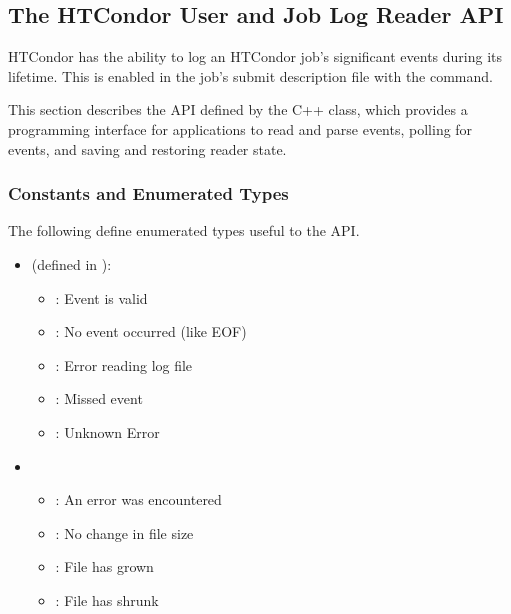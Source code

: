 \subsection{\label{sec:job-log-reader}The HTCondor User and Job Log Reader API}

HTCondor has the ability to log an HTCondor job's significant events during 
its lifetime.
This is enabled in the job's submit description file with the
 command.

This section describes the API defined by the C++  class,
which provides a programming interface for applications
to read and parse events,
polling for events, and saving and restoring reader state.

\subsubsection{Constants and Enumerated Types}

The following define enumerated types useful to the API.

\begin{itemize}
\item {} (defined in ):
  \begin{itemize}
    \item {}: Event is valid
    \item {}: No event occurred (like EOF)
    \item {}: Error reading log file
    \item {}: Missed event
    \item {}: Unknown Error
  \end{itemize}

\item {}
  \begin{itemize}
    \item {}: An error was encountered
    \item {}: No change in file size
    \item {}: File has grown
    \item {}: File has shrunk
  \end{itemize}

\end{itemize}



